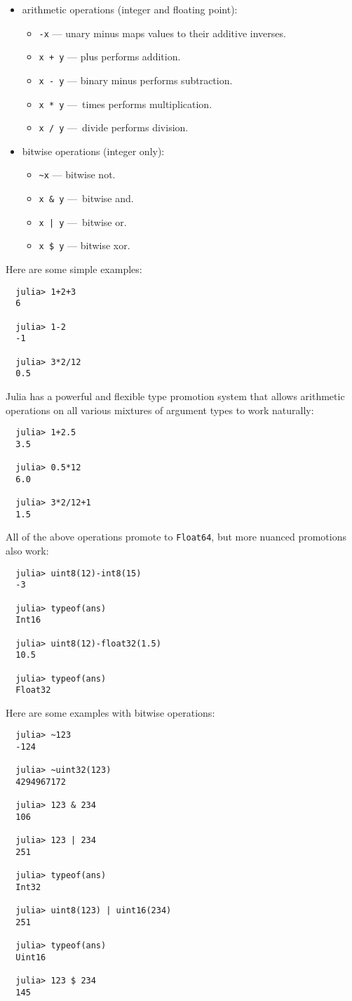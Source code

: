 \documentclass{article}
\begin{document}
\begin{itemize}
  \item arithmetic operations (integer and floating point):
  \begin{itemize}
    \item \verb|-x| — unary minus maps values to their additive inverses.
    \item \verb|x + y| — plus performs addition.
    \item \verb|x - y| — binary minus performs subtraction.
    \item \verb|x * y| — times performs multiplication.
    \item \verb|x / y| — divide performs division.
  \end{itemize}
  \item bitwise operations (integer only):
  \begin{itemize}
    \item \verb|~x| — bitwise not.
    \item \verb|x & y| — bitwise and.
    \item \texttt{x | y} — bitwise or.
    \item \verb|x $ y| — bitwise xor.
  \end{itemize}
\end{itemize}
Here are some simple examples:
\begin{verbatim}
  julia> 1+2+3
  6

  julia> 1-2
  -1

  julia> 3*2/12
  0.5
\end{verbatim}
Julia has a powerful and flexible type promotion system that allows arithmetic operations on all various mixtures of argument types to work naturally:
\begin{verbatim}
  julia> 1+2.5
  3.5

  julia> 0.5*12
  6.0

  julia> 3*2/12+1
  1.5
\end{verbatim}
All of the above operations promote to \verb|Float64|, but more nuanced promotions also work:
\begin{verbatim}
  julia> uint8(12)-int8(15)
  -3

  julia> typeof(ans)
  Int16

  julia> uint8(12)-float32(1.5)
  10.5

  julia> typeof(ans)
  Float32
\end{verbatim}
Here are some examples with bitwise operations:
\begin{verbatim}
  julia> ~123
  -124

  julia> ~uint32(123)
  4294967172

  julia> 123 & 234
  106

  julia> 123 | 234
  251

  julia> typeof(ans)
  Int32

  julia> uint8(123) | uint16(234)
  251

  julia> typeof(ans)
  Uint16

  julia> 123 $ 234
  145
\end{verbatim}
\end{document}
